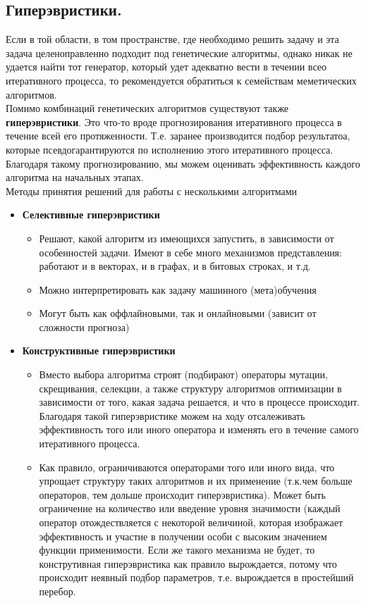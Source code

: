 \subsection{Гиперэвристики.}
Если в той области, в том пространстве, где необходимо решить задачу и эта задача целеноправленно подходит под генетические алгоритмы, однако никак не удается найти тот генератор, который удет адекватно вести в течении всео итеративного процесса, то рекомендуется обратиться к семействам  меметических алгоритмов.\\
Помимо комбинаций генетических алгоритмов существуют также \textbf{гиперэвристики}. Это что-то вроде прогнозирования итеративного процесса в течение всей его протяженности. Т.е. заранее производится подбор результатоа, которые псевдогарантируются по исполнению этого итеративного процесса. Благодаря такому прогнозированию, мы можем оценивать эффективность каждого алгоритма на начальных этапах.\\
Методы принятия решений для работы с несколькими алгоритмами
\begin{itemize}
    \item \textbf{Селективные гиперэвристики}
    \begin{itemize}
        \item Решают, какой алгоритм из имеющихся запустить, в зависимости от особенностей задачи. Имеют в себе много механизмов  представления: работают и в векторах, и в графах, и в битовых строках, и т.д.
        \item Можно интерпретировать как задачу машинного (мета)обучения
        \item Могут быть как оффлайновыми, так и онлайновыми (зависит от сложности прогноза)
    \end{itemize}
    \item \textbf{Конструктивные гиперэвристики}
    \begin{itemize}
        \item Вместо выбора алгоритма строят (подбирают) операторы мутации, скрещивания, селекции, а также структуру алгоритмов оптимизации в зависимости от того, какая задача решается, и что в процессе происходит.\\
        Благодаря такой гиперэвристике можем на ходу отсалеживать эффективность того или иного оператора и изменять его в течение самого итеративного процесса.
        \item Как правило, ограничиваются операторами того или иного вида, что упрощает структуру таких алгоритмов и их применение (т.к.чем больше операторов, тем дольше происходит гиперэвристика). Может быть ограничение на количество или введение уровня значимости (каждый оператор отождествляется с некоторой величиной, которая изображает эффективность и участие в получении особи с высоким значением функции применимости. Если же такого механизма не будет, то конструтивная гиперэвристика как правило вырождается, потому что происходит неявный подбор параметров, т.е. вырождается в простейший перебор.
    \end{itemize}
\end{itemize}      
